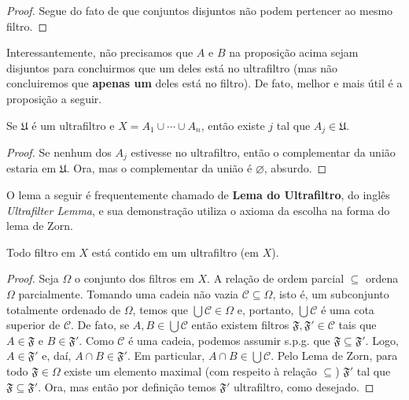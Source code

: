  \begin{proof}
 Segue do fato de que conjuntos disjuntos não podem pertencer ao mesmo filtro.
 \end{proof}
 
 Interessantemente, não precisamos que
 $A$
 e
 $B$
 na proposição acima sejam disjuntos para
 concluirmos que um deles está no ultrafiltro
 (mas não concluiremos que \textbf{apenas um}
 deles está no filtro).
 De fato, melhor e mais útil é a proposição
 a seguir.
 
 \begin{proposition}
 Se 
 $\mathfrak{U}$ 
 é um ultrafiltro e 
 $X = A_1 \cup \dotsb \cup A_n$, 
 então existe
 $j$
 tal que 
 $A_j \in \mathfrak{U}$.
 \end{proposition}
 
 \begin{proof}
 Se nenhum dos
 $A_j$
 estivesse no ultrafiltro,
 então o complementar da união estaria em
 $\mathfrak{U}$.
 Ora, mas o complementar da união é
 $\varnothing$,
 absurdo.
 \end{proof}
 
 
 O lema a seguir é frequentemente chamado de
 \textbf{Lema do Ultrafiltro}, do inglês
 \textit{Ultrafilter Lemma}, e sua demonstração
 utiliza o axioma da escolha na forma do
 lema de Zorn.
 
 \begin{lemma}[Ultrafiltro]
 Todo filtro em
 $X$
 está contido em um ultrafiltro (em $X$).
 \end{lemma}
 \begin{proof}
 Seja
 $\Omega$
 o conjunto dos filtros em
 $X$.
 A relação de ordem parcial
 $\subseteq$
 ordena
 $\Omega$
 parcialmente. 
 Tomando uma cadeia não vazia
 $\mathscr{C} \subseteq \Omega$,
 isto é, um subconjunto totalmente ordenado de
 $\Omega$,
 temos que
 $\displaystyle{ \bigcup \mathscr{C} } \in \Omega$
 e, portanto,
 $\displaystyle{ \bigcup \mathscr{C} }$
 é uma cota superior de
 $\mathscr{C}$.
 De fato, se
 $A,B \in \displaystyle{ \bigcup \mathscr{C} }$
 então existem filtros
 $\mathfrak{F}, \mathfrak{F}' \in \mathscr{C}$
 tais que
 $A \in \mathfrak{F}$
 e
 $B \in \mathfrak{F}'$.
 Como 
 $\mathscr{C}$
 é uma cadeia, podemos assumir s.p.g. que
 $\mathfrak{F} \subseteq \mathfrak{F}'$.
 Logo,
 $A \in \mathfrak{F}'$
 e, daí,
 $A \cap B \in \mathfrak{F}'$.
 Em particular,
 $A \cap B \in \displaystyle{ \bigcup \mathscr{C} }$.
 Pelo Lema de Zorn, 
 para todo
 $\mathfrak{F} \in \Omega$
 existe um elemento maximal 
 (com respeito à relação $\subseteq$)
 $\mathfrak{F}'$
 tal que
 $\mathfrak{F} \subseteq \mathfrak{F}'$.
 Ora, mas então por definição temos
 $\mathfrak{F}'$
 ultrafiltro, como desejado.
 \end{proof}
 
